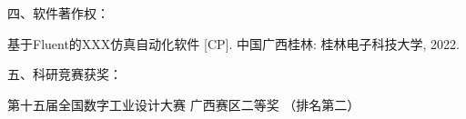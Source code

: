 \noindent %
四、软件著作权：
\begingroup
\setlength{\itemsep}{0bp}\setlength{\parskip}{0pt}
    \begin{enumerate}[label={[\arabic*]}]  
        \item 基于Fluent的XXX仿真自动化软件 [CP]. 中国广西桂林: 桂林电子科技大学, 2022.
    \end{enumerate}
\endgroup
\vspace{3mm}

\noindent %
五、科研竞赛获奖：
\begingroup
    \setlength{\itemsep}{0bp}\setlength{\parskip}{0pt}
    \begin{enumerate}[label={[\arabic*]}]  
        \item 第十五届全国数字工业设计大赛 广西赛区二等奖 （排名第二）   
    \end{enumerate}
\endgroup


